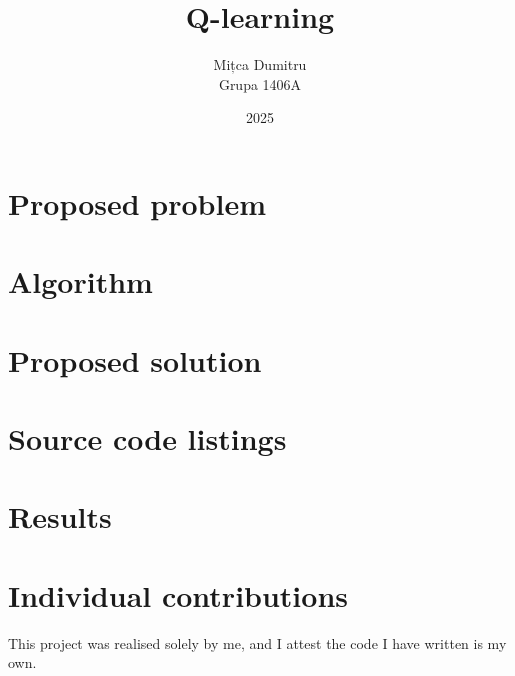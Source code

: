 \documentclass[12pt]{article}
\title{Q-learning}
\author{
  Mițca Dumitru\\
  Grupa 1406A
}
\date{2025}
\begin{document}
\maketitle

\hypersetup{linkbordercolor=1 1 1}
\tableofcontents
\hypersetup{linkbordercolor=1 0 0}

\singlespacing
\newpage

\section{Proposed problem}

\section{Algorithm}

\cite{8836506}

\section{Proposed solution}

\section{Source code listings}

\section{Results}

\newpage




\section*{Individual contributions}
This project was realised solely by me, and I attest the code I have written is my own.
\end{document}
